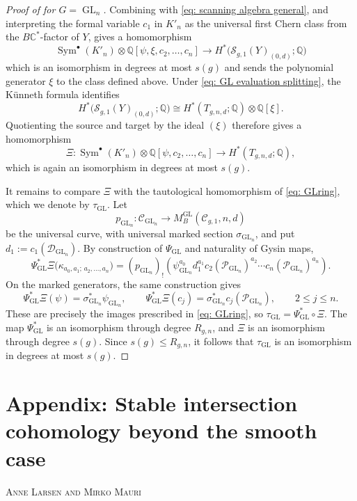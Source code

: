 \documentclass[11pt,reqno]{amsart}
\theoremstyle{plain} %
\theoremstyle{definition}
\newcommand{\QQ}{\mathbb{Q}}
\newcommand{\CC}{\mathbb{C}}
\newcommand{\C}{\mathcal{C}}
\DeclareMathOperator{\GL}{GL}
\DeclareMathOperator{\Sym}{Sym}
\newcommand{\Sc}{\mathcal{S}}
\begin{document}
\begin{proof}[Proof of  for $G=\GL_n$]
Combining  with \eqref{eq: scanning algebra general}, and interpreting the formal variable $c_1$ in $K'_n$ as the universal first Chern class from the $B\CC^*$-factor of $Y$, gives a homomorphism
\[
\Sym^\bullet(K'_n)\otimes\QQ[\psi,\xi,c_2,\dots,c_n]
\longrightarrow
H^*\big(\Sc_{g,1}(Y)_{(0,d)};\QQ\big)
\]
which is an isomorphism in degrees at most $s(g)$ and sends the polynomial generator $\xi$ to the class defined above. Under \eqref{eq: GL evaluation splitting}, the K\"unneth formula identifies
\[
H^*\big(\Sc_{g,1}(Y)_{(0,d)};\QQ\big)
\cong H^*(T_{g,n,d};\QQ)\otimes\QQ[\xi].
\]
Quotienting the source and target by the ideal $(\xi)$ therefore gives a homomorphism
\begin{equation}\label{eq: GL target algebra}
\Xi\colon
\Sym^\bullet(K'_n)\otimes\QQ[\psi,c_2,\dots,c_n]
\longrightarrow H^*(T_{g,n,d};\QQ),
\end{equation}
which is again an isomorphism in degrees at most $s(g)$.

It remains to compare $\Xi$ with the tautological homomorphism of \eqref{eq: GLring}, which we denote by $\tau_{\GL}$. Let
\[
p_{\GL_n}\colon\mathcal C_{\GL_n}\longrightarrow M_B^{\GL}(\C_{g,1},n,d)
\]
be the universal curve, with universal marked section $\sigma_{\GL_n}$, and put $d_1:=c_1(\mathcal D_{\GL_n})$. By construction of $\Psi_{\GL}$ and naturality of Gysin maps,
\[
\Psi_{\GL}^*\Xi\big(\kappa_{a_0,a_1;\,a_2,\dots,a_n}\big)=(p_{\GL_n})_!\left(\psi_{\GL_n}^{a_0}d_1^{a_1}c_2(\mathcal P_{\GL_n})^{a_2}\cdots c_n(\mathcal P_{\GL_n})^{a_n}\right).
\]
On the marked generators, the same construction gives
\[
\Psi_{\GL}^*\Xi(\psi)=\sigma_{\GL_n}^*\psi_{\GL_n},
\qquad
\Psi_{\GL}^*\Xi(c_j)=\sigma_{\GL_n}^*c_j(\mathcal P_{\GL_n}),\qquad 2\leq j\leq n.
\]
These are precisely the images prescribed in \eqref{eq: GLring}, so $\tau_{\GL}=\Psi_{\GL}^*\circ\Xi$. The map $\Psi_{\GL}^*$ is an isomorphism through degree $R_{g,n}$, and $\Xi$ is an isomorphism through degree $s(g)$. Since $s(g)\leq R_{g,n}$, it follows that $\tau_{\GL}$ is an isomorphism in degrees at most $s(g)$.
\end{proof}

\appendix
\section*{Appendix: Stable intersection cohomology beyond the smooth case} 
\setcounter{section}{1}
\setcounter{theorem}{0}
\begin{center}
\textsc{Anne Larsen and Mirko Mauri}
\end{center}
\end{document}
